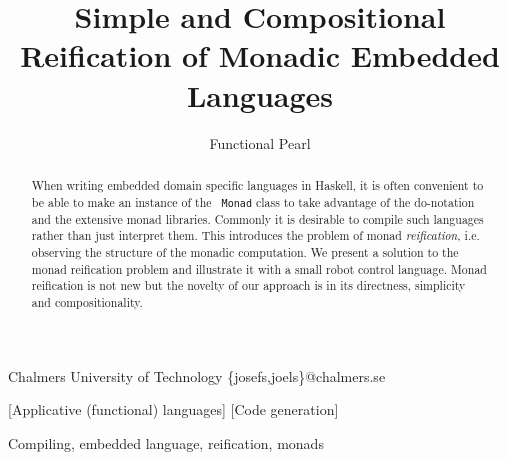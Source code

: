 \documentclass{sigplanconf}
\begin{document}
\exclusivelicense
{} 


\title{Simple and Compositional Reification of Monadic Embedded Languages}
\subtitle{Functional Pearl}

           {Chalmers University of Technology}
           {\{josefs,joels\}@chalmers.se}

\maketitle

\begin{abstract}
When writing embedded domain specific languages in Haskell, it is
often convenient to be able to make an instance of the {\tt
Monad} class to take advantage of the do-notation and the extensive
monad libraries. Commonly it is desirable to compile such languages 
rather than just interpret them.
This introduces the problem of monad {\em reification}, i.e. observing 
the structure of the monadic computation.
We present a solution to the monad reification problem and
illustrate it with a small robot control language.
Monad reification is not new but the novelty
of our approach is in its directness, simplicity and compositionality.
\end{abstract}

[Applicative (functional) languages]
[Code generation]

\keywords
Compiling, embedded language, reification, monads

%
\end{document}
